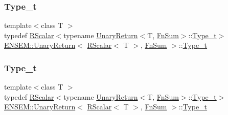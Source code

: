 \subsubsection{\texorpdfstring{Type\_t}{Type\_t}\hspace{0.1cm}{\footnotesize\ttfamily [1/3]}}
{\footnotesize\ttfamily template$<$class T $>$ \\
typedef \mbox{\hyperlink{classENSEM_1_1RScalar}{R\+Scalar}}$<$typename \mbox{\hyperlink{structENSEM_1_1UnaryReturn}{Unary\+Return}}$<$T, \mbox{\hyperlink{structENSEM_1_1FnSum}{Fn\+Sum}}$>$\+::\mbox{\hyperlink{structENSEM_1_1UnaryReturn_3_01RScalar_3_01T_01_4_00_01FnSum_01_4_aca06bc5e18b4787990a7e7bd5e72d38c}{Type\+\_\+t}}$>$ \mbox{\hyperlink{structENSEM_1_1UnaryReturn}{E\+N\+S\+E\+M\+::\+Unary\+Return}}$<$ \mbox{\hyperlink{classENSEM_1_1RScalar}{R\+Scalar}}$<$ T $>$, \mbox{\hyperlink{structENSEM_1_1FnSum}{Fn\+Sum}} $>$\+::\mbox{\hyperlink{structENSEM_1_1UnaryReturn_3_01RScalar_3_01T_01_4_00_01FnSum_01_4_aca06bc5e18b4787990a7e7bd5e72d38c}{Type\+\_\+t}}}

\mbox{\label{structENSEM_1_1UnaryReturn_3_01RScalar_3_01T_01_4_00_01FnSum_01_4_aca06bc5e18b4787990a7e7bd5e72d38c}} 
\subsubsection{\texorpdfstring{Type\_t}{Type\_t}\hspace{0.1cm}{\footnotesize\ttfamily [2/3]}}
{\footnotesize\ttfamily template$<$class T $>$ \\
typedef \mbox{\hyperlink{classENSEM_1_1RScalar}{R\+Scalar}}$<$typename \mbox{\hyperlink{structENSEM_1_1UnaryReturn}{Unary\+Return}}$<$T, \mbox{\hyperlink{structENSEM_1_1FnSum}{Fn\+Sum}}$>$\+::\mbox{\hyperlink{structENSEM_1_1UnaryReturn_3_01RScalar_3_01T_01_4_00_01FnSum_01_4_aca06bc5e18b4787990a7e7bd5e72d38c}{Type\+\_\+t}}$>$ \mbox{\hyperlink{structENSEM_1_1UnaryReturn}{E\+N\+S\+E\+M\+::\+Unary\+Return}}$<$ \mbox{\hyperlink{classENSEM_1_1RScalar}{R\+Scalar}}$<$ T $>$, \mbox{\hyperlink{structENSEM_1_1FnSum}{Fn\+Sum}} $>$\+::\mbox{\hyperlink{structENSEM_1_1UnaryReturn_3_01RScalar_3_01T_01_4_00_01FnSum_01_4_aca06bc5e18b4787990a7e7bd5e72d38c}{Type\+\_\+t}}}


